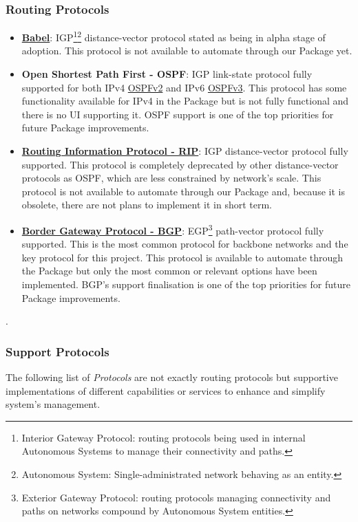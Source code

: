 \subsubsection{Routing Protocols}
\begin{itemize}
    \item \textbf{\href{https://www.irif.fr/~jch//software/babel/}{Babel}}: IGP\footnote{Interior Gateway Protocol: routing protocols being used in internal Autonomous Systems to manage their connectivity and paths.}\footnote{Autonomous System: Single-administrated network behaving as an entity.} distance-vector protocol stated as being in alpha stage of adoption.
    This protocol is not available to automate through our Package yet.
    \item \textbf{Open Shortest Path First - OSPF}: IGP link-state protocol fully supported for both IPv4 \href{https://tools.ietf.org/html/rfc2328}{OSPFv2} and IPv6 \href{https://tools.ietf.org/html/rfc5340}{OSPFv3}.
    This protocol has some functionality available for IPv4 in the Package but is not fully functional and there is no UI supporting it. OSPF support is one of the top priorities for future Package improvements.
    \item \textbf{\href{https://www.rfc-editor.org/rfc/rfc2453.txt}{Routing Information Protocol - RIP}}: IGP distance-vector protocol fully supported. This protocol is completely deprecated by other distance-vector protocols as OSPF, which are less constrained by network's scale.
    This protocol is not available to automate through our Package and, because it is obsolete, there are not plans to implement it in short term.
    \item \textbf{\href{https://www.rfc-editor.org/rfc/rfc4271.txt}{Border Gateway Protocol - BGP}}: EGP\footnote{Exterior Gateway Protocol: routing protocols managing connectivity and paths on networks compound by Autonomous System entities.} path-vector protocol fully supported. This is the most common protocol for backbone networks and the key protocol for this project.
    This protocol is available to automate through the Package but only the most common or relevant options have been implemented. BGP's support finalisation is one of the top priorities for future Package improvements. 
\end{itemize}.

\subsubsection{Support Protocols}
\label{sub:sub:supproto}
The following list of \textit{Protocols} are not exactly routing protocols but supportive implementations of different capabilities or services to enhance and simplify system's management.

